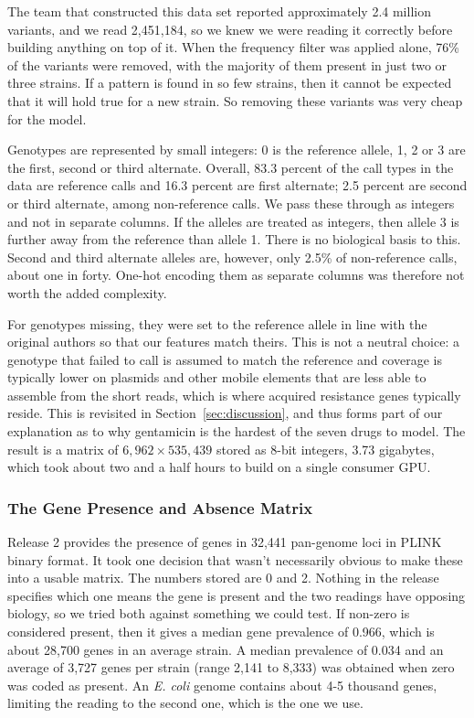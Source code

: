 The team that constructed this data set reported approximately 2.4 million variants, and we
read 2,451,184, so we knew we were reading it correctly before building anything on top of it.
When the frequency filter was applied alone, 76\% of the variants were removed, with the
majority of them present in just two or three strains. If a pattern is found in so few strains,
then it cannot be expected that it will hold true for a new strain. So removing these variants
was very cheap for the model.

Genotypes are represented by small integers: 0 is the reference allele, 1, 2 or 3 are the
first, second or third alternate. Overall, 83.3 percent of the call types in the data are
reference calls and 16.3 percent are first alternate; 2.5 percent are second or third
alternate, among non-reference calls. We pass these through as integers and not in separate
columns. If the alleles are treated as integers, then allele 3 is further away from the
reference than allele 1. There is no biological basis to this. Second and third alternate
alleles are, however, only 2.5\% of non-reference calls, about one in forty. One-hot encoding
them as separate columns was therefore not worth the added complexity.

For genotypes missing, they were set to the reference allele in line with the original authors
so that our features match theirs. This is not a neutral choice: a genotype that failed to
call is assumed to match the reference and coverage is typically lower on plasmids and other
mobile elements that are less able to assemble from the short reads, which is where acquired
resistance genes typically reside. This is revisited in Section~\ref{sec:discussion}, and thus
forms part of our explanation as to why gentamicin is the hardest of the seven drugs to model.
The result is a matrix of $6{,}962 \times 535{,}439$ stored as 8-bit integers, 3.73 gigabytes,
which took about two and a half hours to build on a single consumer GPU.

\subsubsection{The Gene Presence and Absence Matrix}

Release 2 provides the presence of genes in 32,441 pan-genome loci in PLINK binary format. It
took one decision that wasn't necessarily obvious to make these into a usable matrix. The
numbers stored are 0 and 2. Nothing in the release specifies which one means the gene is
present and the two readings have opposing biology, so we tried both against something we
could test. If non-zero is considered present, then it gives a median gene prevalence of
0.966, which is about 28,700 genes in an average strain. A median prevalence of 0.034 and an
average of 3,727 genes per strain (range 2,141 to 8,333) was obtained when zero was coded as
present. An \textit{E. coli} genome contains about 4-5 thousand genes, limiting the reading to
the second one, which is the one we use.

